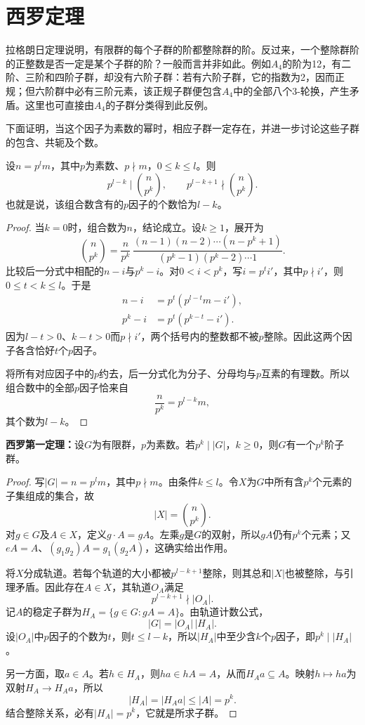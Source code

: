\section{西罗定理}

拉格朗日定理说明，有限群的每个子群的阶都整除群的阶。反过来，一个整除群阶的正整数是否一定是某个子群的阶？一般而言并非如此。例如$A_4$的阶为12，有二阶、三阶和四阶子群，却没有六阶子群：若有六阶子群，它的指数为2，因而正规；但六阶群中必有三阶元素，该正规子群便包含$A_4$中的全部八个3-轮换，产生矛盾。这里也可直接由$A_4$的子群分类得到此反例。

下面证明，当这个因子为素数的幂时，相应子群一定存在，并进一步讨论这些子群的包含、共轭及个数。

\begin{lemma}
设$n=p^lm$，其中$p$为素数、$p\nmid m$，$0\leq k\leq l$。则
\[
p^{l-k}\mid\binom n{p^k},\qquad
p^{l-k+1}\nmid\binom n{p^k}.
\]
也就是说，该组合数含有的$p$因子的个数恰为$l-k$。
\end{lemma}
\begin{proof}
当$k=0$时，组合数为$n$，结论成立。设$k\geq1$，展开为
\[
\binom n{p^k}
=\frac{n}{p^k}\,
\frac{(n-1)(n-2)\cdots(n-p^k+1)}{(p^k-1)(p^k-2)\cdots1}.
\]
比较后一分式中相配的$n-i$与$p^k-i$。对$0<i<p^k$，写$i=p^ti'$，其中$p\nmid i'$，则$0\leq t<k\leq l$。于是
\begin{align*}
n-i&=p^t(p^{l-t}m-i'),\\
p^k-i&=p^t(p^{k-t}-i').
\end{align*}
因为$l-t>0$、$k-t>0$而$p\nmid i'$，两个括号内的整数都不被$p$整除。因此这两个因子各含恰好$t$个$p$因子。

将所有对应因子中的$p$约去，后一分式化为分子、分母均与$p$互素的有理数。所以组合数中的全部$p$因子恰来自
\[
\frac n{p^k}=p^{l-k}m,
\]
其个数为$l-k$。
\end{proof}

\begin{theorem}\label{p2:sylow-one}
\textbf{西罗第一定理：}设$G$为有限群，$p$为素数。若$p^k\mid|G|$，$k\geq0$，则$G$有一个$p^k$阶子群。
\end{theorem}
\begin{proof}
写$|G|=n=p^lm$，其中$p\nmid m$。由条件$k\leq l$。令$X$为$G$中所有含$p^k$个元素的子集组成的集合，故
\[
|X|=\binom n{p^k}.
\]
对$g\in G$及$A\in X$，定义$g\cdot A=gA$。左乘$g$是$G$的双射，所以$gA$仍有$p^k$个元素；又$eA=A$、$(g_1g_2)A=g_1(g_2A)$，这确实给出作用。

将$X$分成轨道。若每个轨道的大小都被$p^{l-k+1}$整除，则其总和$|X|$也被整除，与引理矛盾。因此存在$A\in X$，其轨道$O_A$满足
\[
p^{l-k+1}\nmid|O_A|.
\]
记$A$的稳定子群为$H_A=\{g\in G:gA=A\}$。由轨道计数公式，
\[
|G|=|O_A|\,|H_A|.
\]
设$|O_A|$中$p$因子的个数为$t$，则$t\leq l-k$，所以$|H_A|$中至少含$k$个$p$因子，即$p^k\mid|H_A|$。

另一方面，取$a\in A$。若$h\in H_A$，则$ha\in hA=A$，从而$H_Aa\subseteq A$。映射$h\mapsto ha$为双射$H_A\to H_Aa$，所以
\[
|H_A|=|H_Aa|\leq|A|=p^k.
\]
结合整除关系，必有$|H_A|=p^k$，它就是所求子群。
\end{proof}

